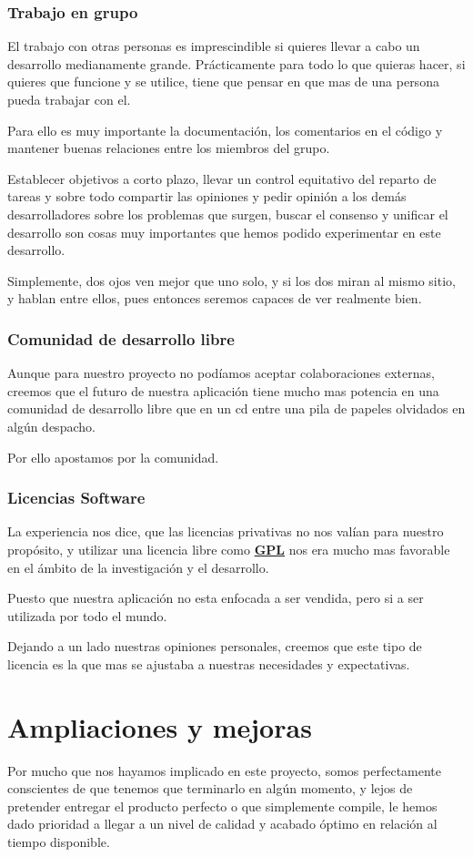 \subsubsection*{Trabajo en grupo}
El trabajo con otras personas es imprescindible si quieres llevar a cabo un
desarrollo medianamente grande. Prácticamente para todo lo que quieras hacer,
si quieres que funcione y se utilice, tiene que pensar en que mas de una
persona pueda trabajar con el.

Para ello es muy importante la documentación, los comentarios en el código y
mantener buenas relaciones entre los miembros del grupo.

Establecer objetivos a corto plazo, llevar un control equitativo del reparto de
tareas y sobre todo compartir las opiniones y pedir opinión a los demás
desarrolladores sobre los problemas que surgen, buscar el consenso y
unificar el desarrollo son cosas muy importantes que hemos podido experimentar
en este desarrollo.

Simplemente, dos ojos ven mejor que uno solo, y si los dos miran al mismo
sitio, y hablan entre ellos, pues entonces seremos capaces de ver realmente
bien.
\subsubsection*{Comunidad de desarrollo libre}
Aunque para nuestro proyecto no podíamos aceptar colaboraciones externas,
creemos que el futuro de nuestra aplicación tiene mucho mas potencia en una
comunidad de desarrollo libre que en un cd entre una pila de papeles olvidados
en algún despacho.

Por ello apostamos por la comunidad.
\subsubsection*{Licencias Software}
La experiencia nos dice, que las licencias privativas no nos valían para
nuestro propósito, y utilizar una licencia libre como \hyperref[ap1]{\bf
GPL} nos era mucho mas
favorable en el ámbito de la investigación y el desarrollo.

Puesto que nuestra aplicación no esta enfocada a ser vendida, pero si a ser
utilizada por todo el mundo.

Dejando a un lado nuestras opiniones personales, creemos que este tipo de
licencia es la que mas se ajustaba a nuestras necesidades y expectativas.
\section*{Ampliaciones y mejoras}
Por  mucho que nos hayamos implicado en este proyecto, somos perfectamente
conscientes de que tenemos que terminarlo en algún momento, y lejos de
pretender entregar el producto perfecto o que simplemente compile, le hemos
dado prioridad a llegar a un nivel de calidad y acabado óptimo en relación al
tiempo disponible.

